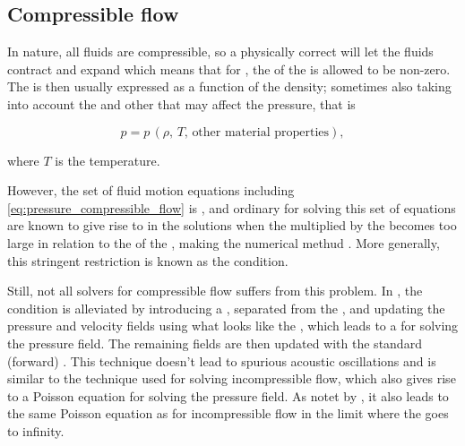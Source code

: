 \subsection{Compressible flow}

In nature, all fluids are compressible, so a physically correct  will let the fluids contract and expand which means that for , the \divergence of the  is allowed to be non-zero. The \pressure is then usually expressed as a function of the density; sometimes also taking into account the \temperature and other \properties that may affect the pressure, that is

\begin{equation} \label{eq:pressure_compressible_flow}
p = p\,(\rho,\,T,\,\text{other material properties}),
\end{equation}

where $T$ is the temperature.

However, the set of fluid motion equations including \eqref{eq:pressure_compressible_flow} is , and ordinary  for solving this set of equations are known to give rise to  in the solutions when the  multiplied by the  becomes too large in relation to the  of the \cells, making the numerical methud \unstable. More generally, this stringent restriction is known as the \CFL condition.

Still, not all solvers for compressible flow suffers from this problem. In \citep{Kwatra2009}, the \CFL condition is alleviated by introducing a , separated from the , and updating the pressure and velocity fields using what looks like the , which leads to a  for solving the pressure field. The remaining fields are then updated with the standard (forward) . This technique doesn't lead to spurious acoustic oscillations and is similar to the technique used for solving incompressible flow, which also gives rise to a Poisson equation for solving the pressure field. As notet by \citep{Kwatra2009}, it also leads to the same Poisson equation as for incompressible flow in the limit where the  goes to infinity.

